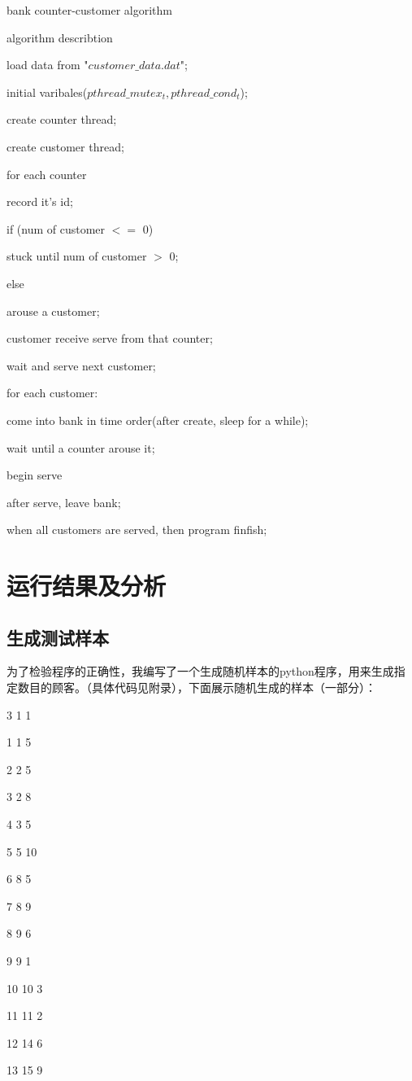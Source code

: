 \documentclass[UTF8]{ctexart}
\begin{document}
\begin{algorithm}
\caption{bank counter-customer algorithm}
\begin{algorithmic}[1]
\STATE algorithm describtion\par
\STATE	\qquad load data from "$customer\_ data.dat$";\par
\STATE	\qquad initial varibales($pthread\_ mutex_t,pthread\_ cond_t$);	\par
\STATE	\qquad create counter thread;	\par
\STATE	\qquad create customer thread;	\par
\STATE \qquad for each counter \par
\STATE	\qquad\qquad record it's id;\par
\STATE	\qquad\qquad if (num of customer $<=$ 0)\par
\STATE	\qquad\qquad\qquad stuck until num of customer $>$ 0;\par
\STATE	\qquad\qquad else\par
\STATE	\qquad\qquad\qquad arouse a customer;\par 
\STATE	\qquad\qquad\qquad customer receive serve from that counter; \par
\STATE	\qquad\qquad wait and serve next customer;\par
\STATE	\qquad for each customer:\par
\STATE	\qquad\qquad come into bank in time order(after create, sleep for a while);\par
\STATE	\qquad\qquad wait until a counter arouse it;\par
\STATE	\qquad\qquad begin serve\par
\STATE	\qquad\qquad after serve, leave bank;\par
\STATE	\qquad when all customers are served, then program finfish;	\par
\end{algorithmic}
\end{algorithm}


\section{运行结果及分析}
\subsection{生成测试样本}
为了检验程序的正确性，我编写了一个生成随机样本的python程序，用来生成指定数目的顾客。（具体代码见附录），下面展示随机生成的样本（一部分）：\par
3 1 1\par
1 1 5\par
2 2 5\par
3 2 8\par
4 3 5\par
5 5 10\par
6 8 5\par
7 8 9\par
8 9 6\par
9 9 1\par
10 10 3\par
11 11 2\par
12 14 6\par
13 15 9\par
\end{document}
